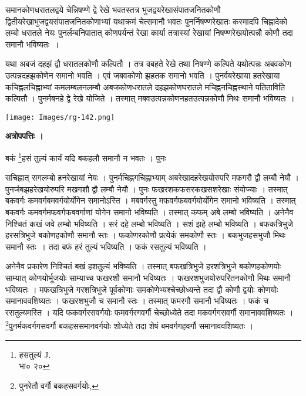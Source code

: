 \documentclass[11pt, openany]{book}
\begin{document}
{\ab समानकोणधरातलद्वये चेन्निषण्णे द्वे रेखे भवतस्तत्र भुजद्वयरेखासंपातजनितकोणौ द्वितीयरेखाभुजद्वयसंपातजनितकोणाभ्यां यथाक्रमं चेत्समानौ भवतः पुनर्निषण्णरेखातः कस्मादपि चिह्नादेको लम्बो धरातले नेयः पुनर्लम्बनिपातात् कोणपर्यन्तं रेखा कार्या तत्रास्यां रेखायां निषण्णरेखयोत्पन्नौ
कोणौ तदा समानौ भविष्यतः~।}\\
\vspace{3mm} 

यथा अबजं दहझं द्वौ धरातलकोणौ कल्पितौ । तत्र वबहते रेखे तथा निषण्णे कल्पिते यथोत्पन्नः अबवकोण उत्पन्नदहझकोणेन समानो भवति । एवं जबवकोणो झहतक समानो भवति । पुनर्वबरेखाया हतरेखाया कचिह्नलचिह्नाभ्यां कमलम्बलनलम्बौ अबजकोणधरातले दहझकोणघरातले मचिह्ननचिह्नस्थाने पतिताविति कल्पितौ । पुनर्मबनहे द्वे रेखे योजिते । तस्मात् मबवउत्पन्नकोणनहतउत्पन्नकोणौ मिथः समानौ भविष्यतः । 
\begin{center}
 \texttt{[image: Images/rg-142.png]}  
 \end{center} 
\vspace{5mm}

\begin{center}
\textbf{\large अत्रोपपत्तिः ।}
\end{center}
\vspace{2mm}

बकं \renewcommand{\thefootnote}{१}\footnote{हसतुल्यं {\en J.}\\
 भा० २०}हसं तुल्यं कार्यं यदि बकहलौ समानौ न भवतः । पुनः

\newpage
\noindent सचिह्नात् सगलम्बो हनरेखायां नेयः ।
पुनर्मचिह्नगचिह्नाभ्याम् अबरेखादहरेखयोरुपरि मफगरौ द्वौ लम्बौ नेयौ । पुनर्जबझहरेखयोरुपरि मखगशौ द्वौ लम्बौ नेयौ । पुनः फखरशकफसरकखसशरेखाः संयोज्याः । तस्मात् बकवर्गः कमवर्गबमवर्गयोर्योगेन समानोऽस्ति । मबवर्गस्तु मफवर्गफबवर्गयोर्योगेन समानो भविष्यति । तस्मात् बकवर्गः कमवर्गमफवर्गफबवर्गाणां योगेन समानो भविष्यति । तस्मात् कफम् अबे लम्बो भविष्यति । अनेनैव निश्चितं कखं जवे लम्बो भविष्यति । सरं दहे लम्बो भविष्यति । सशं झहे लम्बो भविष्यति । बफकत्रिभुजे हरसत्रिभुजे बकोणहकोणौ समानौ स्तः । फकोणरकोणौ प्रत्येकं समकोणौ स्तः । बकभुजहसभुजौ मिथः समानौ स्तः~। तदा बफं हरं तुल्यं भविष्यति । फकं रसतुल्यं भविष्यति ।\\
\vspace{7mm}

अनेनैव प्रकारेण निश्चितं बखं हशतुल्यं भविष्यति । तस्मात् बफखत्रिभुजे हरशत्रिभुजे बकोणहकोणयोः साम्यात् कोणयोर्भूजयोः साम्याच्च फखरशौ समानौ भविष्यतः । फखरशभुजयोरुपरितनकोणौ मिथः समानौ भविष्यतः । मफखत्रिभुजे गरशत्रिभुजे पूर्वकोणाः समकोणेभ्यश्चेच्छोध्यन्ते तदा द्वौ कोणौ द्वयोः कोणयोः समानाववशिष्यतः । फखरशभुजौ च समानौ स्तः । तस्मात् फमरगौ समानौ भविष्यतः । फकं च रसतुल्यमस्ति । यदि फकवर्गरसवर्गयोः फमवर्गरगवर्गौ चेच्छोध्येते तदा
मकवर्गगसवर्गौ समानाववशिष्यतः । \renewcommand{\thefootnote}{१}\footnote{पुनरेतौ वर्गौ बकहसवर्गयोः,}पुनर्मकवर्गगसवर्गौ
बकहससमानवर्गयोः शोध्येते तदा शेषं बमवर्गगहवर्गौ समानाववशिष्यतः । \\
\vspace{7mm}
\end{document}
